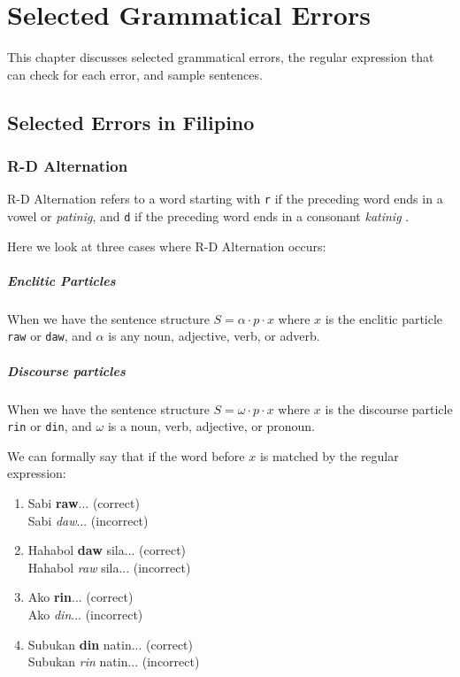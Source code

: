\chapter{Selected Grammatical Errors}
\label{errors}

This chapter discusses selected grammatical errors, the regular expression that can check for each error, and sample sentences.

\section{Selected Errors in Filipino}
\subsection{R-D Alternation}
\label{rd_alternation}

R-D Alternation refers to a word starting with \texttt{r} if the preceding word ends in a vowel or \textit{patinig}, and \texttt{d} if the preceding word ends in a consonant \textit{katinig} \cite{KWF, OOP}. 

Here we look at three cases where R-D Alternation occurs:

\paragraph{Enclitic Particles} When we have the sentence structure \(S = \alpha \cdot p \cdot x\) where $x$ is the enclitic particle \texttt{raw} or \texttt{daw}, and \(\alpha\) is any noun, adjective, verb, or adverb. 

\paragraph{Discourse particles} When we have the sentence structure $S = \omega \cdot p \cdot x$ where $x$ is the discourse particle \texttt{rin} or \texttt{din}, and $\omega$ is a noun, verb, adjective, or pronoun.

We can formally say that if the word before $x$ is matched by the regular expression:

\begin{example}
\end{example}

\begin{enumerate}
    \item Sabi \textbf{raw}... (correct)
        \\ Sabi \textit{daw}... (incorrect)
    \item Hahabol \textbf{daw} sila... (correct)
        \\ Hahabol \textit{raw} sila... (incorrect)
    \item Ako \textbf{rin}... (correct)
        \\ Ako \textit{din}... (incorrect)
    \item Subukan \textbf{din} natin... (correct)
        \\ Subukan \textit{rin} natin... (incorrect)
\end{enumerate}

